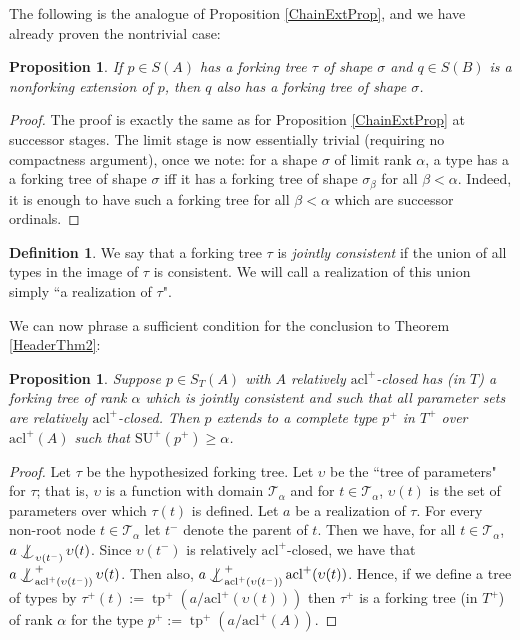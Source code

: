 \documentclass{article}
\DeclareMathOperator{\tp}{tp}
\def\notind#1#2{#1\setbox0=\hbox{$#1x$}\kern\wd0
\hbox to 0pt{\mathchardef\nn=12854\hss$#1\nn$\kern1.4\wd0\hss}
\hbox to 0pt{\hss$#1\mid$\hss}\lower.9\ht0 \hbox to 0pt{\hss$#1\smile$\hss}\kern\wd0}
\def\nind{\mathop{\mathpalette\notind{}}}
\newtheorem{prop}[theorem]{Proposition}
\theoremstyle{remark}
\theoremstyle{definition}
\newtheorem{definition}[theorem]{Definition}
\begin{document}
The following is the analogue of Proposition \ref{ChainExtProp}, and we have already proven the nontrivial case: 
\begin{prop}\label{TreeExtProp}
    If $p\in S(A)$ has a forking tree $\tau$ of shape $\sigma$ and $q\in S(B)$ is a nonforking extension of $p$, then $q$ also has a forking tree of shape $\sigma$.
\end{prop}
\begin{proof}
    The proof is exactly the same as for Proposition \ref{ChainExtProp} at successor stages. The limit stage is now essentially trivial (requiring no compactness argument), once we note: for a shape $\sigma$ of limit rank $\alpha$, a type has a a forking tree of shape $\sigma$ iff it has a forking tree of shape $\sigma_\beta$ for all $\beta<\alpha$. Indeed, it is enough to have such a forking tree for all $\beta<\alpha$ which are successor ordinals.
\end{proof}


\begin{definition}
    We say that a forking tree $\tau$ is \textit{jointly consistent} if the union of all types in the image of $\tau$ is consistent. We will call a realization of this union simply ``a realization of $\tau$".
\end{definition}



We can now phrase a sufficient condition for the conclusion to Theorem \ref{HeaderThm2}:

\begin{prop}\label{GoalProp}
    Suppose $p\in S_T(A)$ with $A$ relatively $\mathrm{acl}^+$-closed has (in $T$) a forking tree of rank $\alpha$ which is jointly consistent and such that all parameter sets are relatively $\mathrm{acl}^+$-closed. Then $p$ extends to a complete type $p^+$ in $T^+$ over $\mathrm{acl}^+(A)$ such that $\text{SU}^+(p^+)\geq \alpha$.
\end{prop}

\begin{proof}
    Let $\tau$ be the hypothesized forking tree. Let $\upsilon$ be the ``tree of parameters" for $\tau$; that is, $\upsilon$ is a function with domain $\mathcal{T}_\alpha$ and for $t\in\mathcal{T}_\alpha$, $\upsilon(t)$ is the set of parameters over which $\tau(t)$ is defined. Let $a$ be a realization of $\tau$. For every non-root node $t\in\mathcal{T}_\alpha$ let $t^-$ denote the parent of $t$. Then we have, for all $t\in\mathcal{T}_\alpha$, $a\nind_{\upsilon (t^-)} \upsilon(t)$. Since $\upsilon(t^-)$ is relatively $\mathrm{acl}^+$-closed, we have that $a\nind_{\mathrm{acl}^+(\upsilon(t^-))}^+ \upsilon(t)$. Then also, $a\nind_{\mathrm{acl}^+(\upsilon(t^-))}^+ \mathrm{acl}^+(\upsilon(t))$. Hence, if we define a tree of types by $\tau^+(t):=\tp^+(a/\mathrm{acl}^+(\upsilon(t)))$ then $\tau^+$ is a forking tree (in $T^+$) of rank $\alpha$ for the type $p^+:=\tp^+(a/\mathrm{acl}^+(A))$.
\end{proof}
\end{document}
